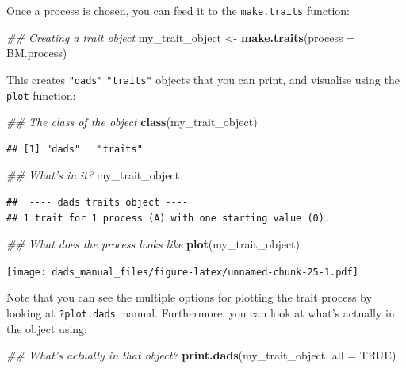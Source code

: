 \documentclass[]{book}
\newenvironment{Shaded}{\begin{snugshade}}{\end{snugshade}}
\newcommand{\CommentTok}[1]{\textcolor[rgb]{0.56,0.35,0.01}{\textit{#1}}}
\newcommand{\DataTypeTok}[1]{\textcolor[rgb]{0.13,0.29,0.53}{#1}}
\newcommand{\KeywordTok}[1]{\textcolor[rgb]{0.13,0.29,0.53}{\textbf{#1}}}
\newcommand{\NormalTok}[1]{#1}
\newcommand{\OtherTok}[1]{\textcolor[rgb]{0.56,0.35,0.01}{#1}}
\newcommand{\StringTok}[1]{\textcolor[rgb]{0.31,0.60,0.02}{#1}}
\begin{document}
Once a process is chosen, you can feed it to the \texttt{make.traits} function:

\begin{Shaded}
\begin{Highlighting}[]
\CommentTok{## Creating a trait object}
\NormalTok{my_trait_object <-}\StringTok{ }\KeywordTok{make.traits}\NormalTok{(}\DataTypeTok{process =}\NormalTok{ BM.process)}
\end{Highlighting}
\end{Shaded}

This creates \texttt{"dads"} \texttt{"traits"} objects that you can print, and visualise using the \texttt{plot} function:

\begin{Shaded}
\begin{Highlighting}[]
\CommentTok{## The class of the object}
\KeywordTok{class}\NormalTok{(my_trait_object)}
\end{Highlighting}
\end{Shaded}

\begin{verbatim}
## [1] "dads"   "traits"
\end{verbatim}

\begin{Shaded}
\begin{Highlighting}[]
\CommentTok{## What's in it?}
\NormalTok{my_trait_object}
\end{Highlighting}
\end{Shaded}

\begin{verbatim}
##  ---- dads traits object ---- 
## 1 trait for 1 process (A) with one starting value (0).
\end{verbatim}

\begin{Shaded}
\begin{Highlighting}[]
\CommentTok{## What does the process looks like}
\KeywordTok{plot}\NormalTok{(my_trait_object)}
\end{Highlighting}
\end{Shaded}

\texttt{[image: dads\_manual\_files/figure-latex/unnamed-chunk-25-1.pdf]}

Note that you can see the multiple options for plotting the trait process by looking at \texttt{?plot.dads} manual. Furthermore, you can look at what's actually in the object using:

\begin{Shaded}
\begin{Highlighting}[]
\CommentTok{## What's actually in that object?}
\KeywordTok{print.dads}\NormalTok{(my_trait_object, }\DataTypeTok{all =} \OtherTok{TRUE}\NormalTok{)}
\end{Highlighting}
\end{Shaded}
\end{document}
